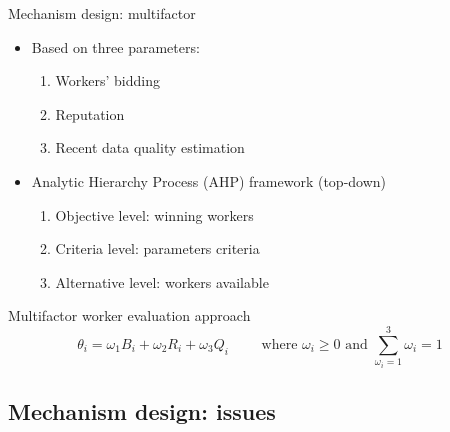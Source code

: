 \begin{frame}{Mechanism design: multifactor}
  \begin{itemize}
    \item Based on three parameters:
          \begin{enumerate}
            \item \alert{Workers' bidding}
            \item \alert{Reputation}
            \item \alert{Recent data quality estimation}
          \end{enumerate}
    \item Analytic Hierarchy Process (AHP) framework \rightarrow (top-down)
    	\begin{enumerate}
            \item \alert{Objective level}: winning workers
            \item \alert{Criteria level}: parameters criteria
            \item \alert{Alternative level}: workers available
          \end{enumerate}
    \end{itemize}
    \begin{exampleblock}{Multifactor worker evaluation approach}
    	\begin{equation*}
      	\theta_{i}=\omega_{1} B_{i}+\omega_{2} R_{i}+\omega_{3} Q_{i} \quad\quad \text { where } \omega_{i} \geq 0 \text { and } \sum_{\omega_{i}=1}^{3} \omega_{i}=1	
    	\end{equation*}
  \end{exampleblock}
\end{frame}

\subsection{Mechanism design: issues}

